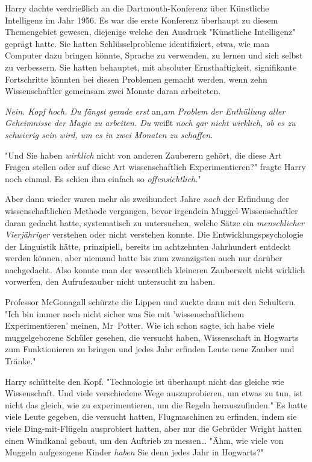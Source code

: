 {Harry dachte verdrießlich an die Dartmouth-Konferenz über Künstliche Intelligenz im Jahr 1956. Es war die erste Konferenz überhaupt zu diesem Themengebiet gewesen, diejenige welche den Ausdruck "Künstliche Intelligenz" geprägt hatte. Sie hatten Schlüsselprobleme identifiziert, etwa, wie man Computer dazu bringen könnte, Sprache zu verwenden, zu lernen und sich selbst zu verbessern. Sie hatten behauptet, mit absoluter Ernsthaftigkeit, signifikante Fortschritte könnten bei diesen Problemen gemacht werden, wenn zehn Wissenschaftler gemeinsam zwei Monate daran arbeiteten.

\emph{Nein. Kopf hoch. Du fängst gerade erst} an\emph{,am Problem der Enthüllung aller Geheimnisse der Magie zu arbeiten. Du} weißt \emph{noch gar nicht wirklich, ob es zu schwierig sein wird, um es in zwei Monaten zu schaffen.}

"Und Sie haben \emph{wirklich} nicht von anderen Zauberern gehört, die diese Art Fragen stellen oder auf diese Art wissenschaftlich Experimentieren?" fragte Harry noch einmal. Es schien ihm einfach so \emph{offensichtlich.}"

Aber dann wieder waren mehr als zweihundert Jahre \emph{nach} der Erfindung der wissenschaftlichen Methode vergangen, bevor irgendein Muggel-Wissenschaftler daran gedacht hatte, systematisch zu untersuchen, welche Sätze ein \emph{menschlicher Vierjähriger} verstehen oder nicht verstehen konnte. Die Entwicklungspsychologie der Linguistik hätte, prinzipiell, bereits im achtzehnten Jahrhundert entdeckt werden können, aber niemand hatte bis zum zwanzigsten auch nur darüber nachgedacht. Also konnte man der wesentlich kleineren Zauberwelt nicht wirklich vorwerfen, den Aufrufezauber nicht untersucht zu haben.

Professor McGonagall schürzte die Lippen und zuckte dann mit den Schultern. "Ich bin immer noch nicht sicher was Sie mit 'wissenschaftlichem Experimentieren' meinen, Mr~Potter. Wie ich schon sagte, ich habe viele muggelgeborene Schüler gesehen, die versucht haben, Wissenschaft in Hogwarts zum Funktionieren zu bringen und jedes Jahr erfinden Leute neue Zauber und Tränke."

Harry schüttelte den Kopf. "Technologie ist überhaupt nicht das gleiche wie Wissenschaft. Und viele verschiedene Wege auszuprobieren, um etwas zu tun, ist nicht das gleich, wie zu experimentieren, um die Regeln herauszufinden." Es hatte viele Leute gegeben, die versucht hatten, Flugmaschinen zu erfinden, indem sie viele Ding-mit-Flügeln ausprobiert hatten, aber nur die Gebrüder Wright hatten einen Windkanal gebaut, um den Auftrieb zu messen… "Ähm, wie viele von Muggeln aufgezogene Kinder \emph{haben} Sie denn jedes Jahr in Hogwarts?"

}
